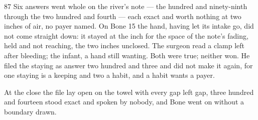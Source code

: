 \begin{CRchronicle}{87}
Six answers went whole on the river’s note --- the hundred and ninety-ninth through the two hundred and fourth --- each exact and worth nothing at two inches of air, no payer named. On Bone 15 the hand, having let its intake go, did not come straight down: it stayed at the inch for the space of the note’s fading, held and not reaching, the two inches unclosed. The surgeon read a clamp left after bleeding; the infant, a hand still wanting. Both were true; neither won. He filed the staying as answer two hundred and three and did not make it again, for one staying is a keeping and two a habit, and a habit wants a payer.

At the close the file lay open on the towel with every gap left gap, three hundred and fourteen stood exact and spoken by nobody, and Bone went on without a boundary drawn.
\end{CRchronicle}
